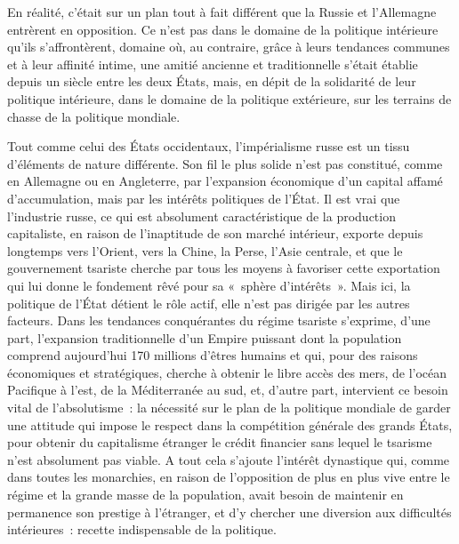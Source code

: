\documentclass[french,twoside]{book} %
\begin{document}
En réalité, c’était sur un plan tout à fait différent que la Russie et l’Allemagne entrèrent en opposition. Ce n’est pas dans le domaine de la politique intérieure qu’ils s’affrontèrent, domaine où, au contraire, grâce à leurs tendances communes et à leur affinité intime, une amitié ancienne et traditionnelle s’était établie depuis un siècle entre les deux États, mais, en dépit de la solidarité de leur politique intérieure, dans le domaine de la politique extérieure, sur les terrains de chasse de la politique mondiale.\par
Tout comme celui des États occidentaux, l’impérialisme russe est un tissu d’éléments de nature différente. Son fil le plus solide n’est pas constitué, comme en Allemagne ou en Angleterre, par l’expansion économique d’un capital affamé d’accumulation, mais par les intérêts politiques de l’État. Il est vrai que l’industrie russe, ce qui est absolument caractéristique de la production capitaliste, en raison de l’inaptitude de son marché intérieur, exporte depuis longtemps vers l’Orient, vers la Chine, la Perse, l’Asie centrale, et que le gouvernement tsariste cherche par tous les moyens à favoriser cette exportation qui lui donne le fondement rêvé pour sa « sphère d’intérêts ». Mais ici, la politique de l’État détient le rôle actif, elle n’est pas dirigée par les autres facteurs. Dans les tendances conquérantes du régime tsariste s’exprime, d’une part, l’expansion traditionnelle d’un Empire puissant dont la population comprend aujourd’hui 170 millions d’êtres humains et qui, pour des raisons économiques et stratégiques, cherche à obtenir le libre accès des mers, de l’océan Pacifique à l’est, de la Méditerranée au sud, et, d’autre part, intervient ce besoin vital de l’absolutisme : la nécessité sur le plan de la politique mondiale de garder une attitude qui impose le respect dans la compétition générale des grands États, pour obtenir du capitalisme étranger le crédit financier sans lequel le tsarisme n’est absolument pas viable. A tout cela s’ajoute l’intérêt dynastique qui, comme dans toutes les monarchies, en raison de l’opposition de plus en plus vive entre le régime et la grande masse de la population, avait besoin de maintenir en permanence son prestige à l’étranger, et d’y chercher une diversion aux difficultés intérieures : recette indispensable de la politique.\par
\end{document}

